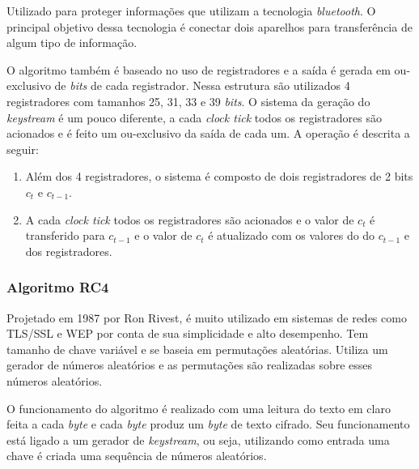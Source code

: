 Utilizado para proteger informações que utilizam a tecnologia \textit{bluetooth}. O principal objetivo dessa tecnologia é conectar dois aparelhos para transferência de algum tipo de informação.

O algoritmo também é baseado no uso de registradores e a saída é gerada em ou-exclusivo de \textit{bits} de cada registrador. Nessa estrutura são utilizados 4 registradores com tamanhos 25, 31, 33 e 39 \textit{bits}. O sistema da geração do \textit{keystream} é um pouco diferente, a cada \textit{clock tick} todos os registradores são acionados e é feito um ou-exclusivo da saída de cada um. A operação é descrita a seguir:

\begin{enumerate}
	\item Além dos 4 registradores, o sistema é composto de dois registradores de 2 bits $c_t$ e $c_{t-1}$.
	\item A cada \textit{clock tick} todos os registradores são acionados e o valor de $ c_t $ é transferido para $ c_{t-1}$ e o valor de $ c_t$ é atualizado com os valores do do $ c_{t-1}$ e dos registradores.
\end{enumerate}

\subsubsection{Algoritmo RC4}
\label{algorithm-rc4}

Projetado em 1987 por Ron Rivest, é muito utilizado em sistemas de redes como TLS/SSL e WEP por conta de sua simplicidade e alto desempenho. Tem tamanho de chave variável e se baseia em permutações aleatórias. Utiliza um gerador de números aleatórios e as permutações são realizadas sobre esses números aleatórios.

O funcionamento do algoritmo é realizado com uma leitura do texto em claro feita a cada \textit{byte} e cada \textit{byte} produz um \textit{byte} de texto cifrado. Seu funcionamento está ligado a um gerador de \textit{keystream}, ou seja, utilizando como entrada uma chave é criada uma sequência de números aleatórios.

